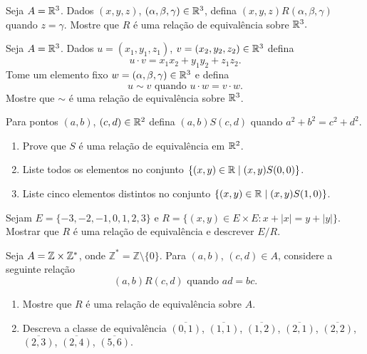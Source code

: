 \documentclass[12pt]{exam}
\begin{document}
    \vspace{.3cm}

    \questao{} Seja $A = \mathbb{R}^3$. Dados $(x, y, z)$, $(\alpha, \beta, \gamma) \in \mathbb{R}^3$, defina $(x, y, z) R (\alpha, \beta, \gamma)$ quando $z = \gamma$. Mostre que $R$ \'e uma rela\c{c}\~ao de equival\^encia sobre $\mathbb{R}^3.$

    \vspace{.3cm}

    \questao{} Seja $A = \mathbb{R}^3$. Dados $u = (x_1, y_1, z_1)$, $v = (x_2, y_2, z_2) \in \mathbb{R}^3$ defina
    \[
        u\cdot v = x_1x_2 + y_1y_2 + z_1z_2.
    \]
    Tome um elemento fixo $w = (\alpha, \beta, \gamma) \in \mathbb{R}^3$ e defina
    \[
        u \sim v \mbox{ quando } u \cdot w = v \cdot w.
    \]
    Mostre que $\sim$ \'e uma rela\c{c}\~ao de equival\^encia sobre $\mathbb{R}^3$.

    \vspace{.3cm}

    \questao{} Para pontos $(a, b)$, $(c, d) \in \mathbb{R}^2$ defina $(a, b) S (c, d)$ quando $a^2 + b^2 = c^2 + d^2$.
    \begin{enumerate}[label={\alph*})]
      \item Prove que $S$ \'e uma rela\c{c}\~ao de equival\^encia em $\mathbb{R}^2$.
      \item Liste todos os elementos no conjunto $\{(x, y) \in \mathbb{R} \mid (x, y) S (0, 0)\}$.
      \item Liste cinco elementos distintos no conjunto $\{(x, y) \in \mathbb{R} \mid (x, y) S (1, 0)\}$.
    \end{enumerate}

    \vspace{.3cm}

    \questao{} Sejam $E = \{-3, -2, -1, 0, 1, 2, 3\}$ e $R = \{(x, y) \in E \times E : x + |x| = y + |y|\}$. Mostrar que $R$ \'e uma rela\c{c}\~ao de equival\^encia e descrever $E/R$.

    \vspace{.3cm}

    \questao{} Seja $A = \mathbb{Z} \times \mathbb{Z}^*$, onde $\mathbb{Z}^* = \mathbb{Z} \setminus \{0\}$. Para $(a,b)$, $(c,d) \in A$, considere a seguinte rela{\c c}{\~a}o
    \[
        (a,b) R (c,d) \mbox{ quando } ad = bc.
    \]
    \begin{enumerate}[label={\alph*})]
        \item Mostre que $R$ {\'e} uma rela{\c c}{\~a}o de equival{\^e}ncia sobre $A$.
        \item Descreva a classe de equival{\^e}ncia $\overline{(0,1)}$, $\overline{(1,1)}$, $\overline{(1,2)}$, $\overline{(2,1)}$, $\overline{(2,2)}$, $\overline{(2,3)}$, $\overline{(2,4)}$, $\overline{(5,6)}$.
    \end{enumerate}
\end{document}
